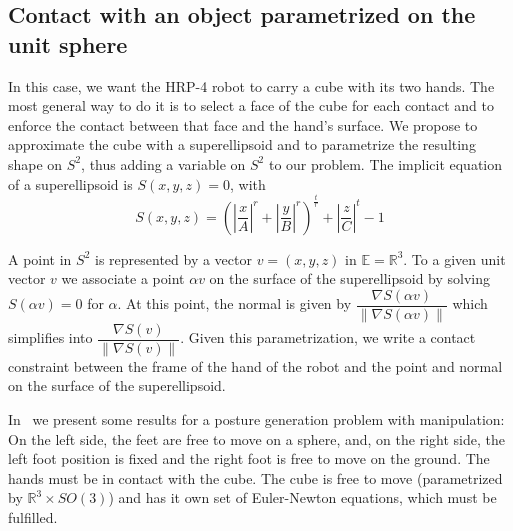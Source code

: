 \subsection{Contact with an object parametrized on the unit sphere}

In this case, we want the HRP-4 robot to carry a cube with its two hands.
The most general way to do it is to select a face of the cube for each contact and to enforce the contact between that face and the hand's surface.
We propose to approximate the cube with a superellipsoid and to parametrize the resulting shape on $S^2$, thus adding a variable on $S^2$ to our problem.
The implicit equation of a superellipsoid is $S(x,y,z) = 0$, with
\begin{equation}
  S(x,y,z) = {\left( \left|\frac{x}{A}\right|^r + \left|\frac{y}{B}\right|^r\right)}^\frac{t}{r} + \left|\frac{z}{C}\right|^t - 1
  \label{eq:super_ellipsoid}
\end{equation}

A point in $S^2$ is represented by a vector $v=(x,y,z)$ in $\mathbb{E} = \mathbb{R}^3$.
To a given unit vector $v$ we associate a point $\alpha v$ on the surface of the superellipsoid by solving $S(\alpha v) = 0$ for $\alpha$.
At this point, the normal is given by $\dfrac{\nabla S(\alpha v)}{\left\|\nabla S(\alpha v)\right\|}$ which simplifies into $\dfrac{\nabla S(v)}{\left\|\nabla S(v)\right\|}$.
Given this parametrization, we write a contact constraint between the frame of the hand of the robot and the point and normal on the surface of the superellipsoid.

In~ we present some results for a posture generation problem with manipulation: On the left side, the feet are free to move on a sphere, and, on the right side, the left foot position is fixed and the right foot is free to move on the ground.
The hands must be in contact with the cube.
The cube is free to move (parametrized by $\mathbb{R}^3 \times SO(3)$) and has it own set of Euler-Newton equations, which must be fulfilled.

